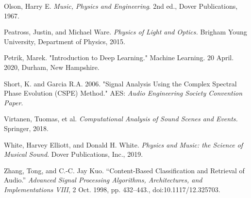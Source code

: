 \documentclass[12pt,letterpaper]{article}
\begin{document}
\begin{thebibliography}{9}
Olson, Harry E. \textit{Music, Physics and Engineering}. 2nd ed., Dover Publications, 1967.

Peatross, Justin, and Michael Ware. \textit{Physics of Light and Optics.} Brigham Young University, Department of Physics, 2015.

Petrik, Marek. "Introduction to Deep Learning." Machine Learning. 20 April. 2020, Durham, New Hampshire.

Short, K. and Garcia R.A. 2006. "Signal Analysis Using the Complex Spectral Phase Evolution (CSPE) Method." AES: \textit{Audio Engineering Society Convention Paper}.

Virtanen, Tuomas, et al. \textit{Computational Analysis of Sound Scenes and Events.} Springer, 2018.

White, Harvey Elliott, and Donald H. White. \textit{Physics and Music: the Science of Musical Sound}. Dover Publications, Inc., 2019.

Zhang, Tong, and C.-C. Jay Kuo. “Content-Based Classification and Retrieval of Audio.” \textit{Advanced Signal Processing Algorithms, Architectures, and Implementations VIII}, 2 Oct. 1998, pp. 432–443., doi:10.1117/12.325703.

\end{thebibliography}

\end{document}
